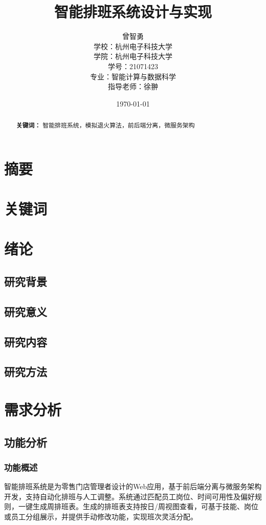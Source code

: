 \documentclass{ctexart}
\title{智能排班系统设计与实现}
\author{
    曾智勇 \\[0.5em]
    \small 学校：杭州电子科技大学 \\[0.5em]
    \small 学院：杭州电子科技大学 \\[0.5em]
    \small 学号：21071423 \\[0.5em]
    \small 专业：智能计算与数据科学 \\[0.5em]
    \small 指导老师：徐翀
}
\date{\today}
\begin{document}
\maketitle
\newpage

\tableofcontents
\newpage

\begin{abstract}
\par\textbf{关键词：} %
智能排班系统，模拟退火算法，前后端分离，微服务架构
\end{abstract}

\section*{摘要}
\section*{关键词}

\section{绪论}
\subsection{研究背景}
\subsection{研究意义}
\subsection{研究内容}
\subsection{研究方法}

\section{需求分析}
\subsection{功能分析}
\subsubsection{功能概述}

智能排班系统是为零售门店管理者设计的Web应用，基于前后端分离与微服务架构开发，支持自动化排班与人工调整。系统通过匹配员工岗位、时间可用性及偏好规则，一键生成周排班表。生成的排班表支持按日/周视图查看，可基于技能、岗位或员工分组展示，并提供手动修改功能，实现班次灵活分配。
\end{document}
